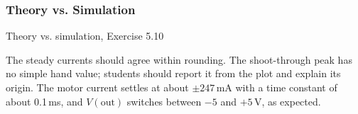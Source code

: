 \subsubsection*{Theory vs. Simulation}
\begin{comparison}{Theory vs. simulation, Exercise 5.10}
\end{comparison}
\begin{solution}
The steady currents should agree within rounding. The shoot-through peak has no simple hand value; students should
report it from the plot and explain its origin. The motor current settles at about $\pm247$\,mA with a time constant of about
0.1\,ms, and $V(\mathrm{out})$ switches between $-5$ and $+5$\,V, as expected.
\end{solution}
